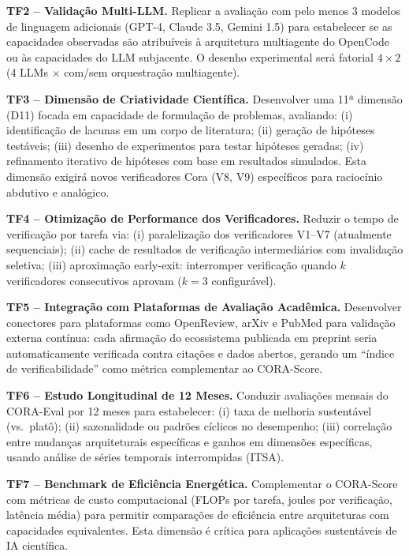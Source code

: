 \textbf{TF2 -- Validação Multi-LLM.} Replicar a avaliação com pelo menos
3 modelos de linguagem adicionais (GPT-4, Claude 3.5, Gemini 1.5) para
estabelecer se as capacidades observadas são atribuíveis à arquitetura
multiagente do OpenCode ou às capacidades do LLM subjacente. O desenho
experimental será fatorial $4 \times 2$ (4 LLMs $\times$ com/sem
orquestração multiagente).

\textbf{TF3 -- Dimensão de Criatividade Científica.} Desenvolver uma 11ª
dimensão (D11) focada em capacidade de formulação de problemas, avaliando:
(i) identificação de lacunas em um corpo de literatura; (ii) geração de
hipóteses testáveis; (iii) desenho de experimentos para testar hipóteses
geradas; (iv) refinamento iterativo de hipóteses com base em resultados
simulados. Esta dimensão exigirá novos verificadores Cora (V8, V9)
específicos para raciocínio abdutivo e analógico.

\textbf{TF4 -- Otimização de Performance dos Verificadores.} Reduzir o
tempo de verificação por tarefa via: (i) paralelização dos verificadores
V1--V7 (atualmente sequenciais); (ii) cache de resultados de verificação
intermediários com invalidação seletiva; (iii) aproximação early-exit:
interromper verificação quando $k$ verificadores consecutivos aprovam
($k=3$ configurável).

\textbf{TF5 -- Integração com Plataformas de Avaliação Acadêmica.}
Desenvolver conectores para plataformas como OpenReview, arXiv e
PubMed para validação externa contínua: cada afirmação do ecossistema
publicada em preprint seria automaticamente verificada contra citações e
dados abertos, gerando um ``índice de verificabilidade'' como métrica
complementar ao CORA-Score.

\textbf{TF6 -- Estudo Longitudinal de 12 Meses.} Conduzir avaliações
mensais do CORA-Eval por 12 meses para estabelecer: (i) taxa de melhoria
sustentável (vs.\ platô); (ii) sazonalidade ou padrões cíclicos no
desempenho; (iii) correlação entre mudanças arquiteturais específicas e
ganhos em dimensões específicas, usando análise de séries temporais
interrompidas (ITSA).

\textbf{TF7 -- Benchmark de Eficiência Energética.} Complementar o
CORA-Score com métricas de custo computacional (FLOPs por tarefa, joules
por verificação, latência média) para permitir comparações de eficiência
entre arquiteturas com capacidades equivalentes. Esta dimensão é crítica
para aplicações sustentáveis de IA científica.

